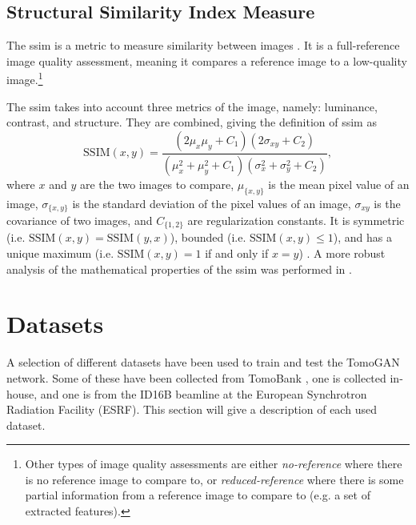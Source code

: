 
\subsection{Structural Similarity Index Measure}
The \gls{ssim} is a metric to measure similarity between images \cite{ssim}. It is a full-reference image quality assessment, meaning it compares a reference image to a low-quality image.\footnote{Other types of image quality assessments are either \textit{no-reference} where there is no reference image to compare to, or \textit{reduced-reference} where there is some partial information from a reference image to compare to (e.g. a set of extracted features)\cite{ssim}. }

The \gls{ssim} takes into account three metrics of the image, namely: luminance, contrast, and structure. They are combined, giving the definition of \gls{ssim} as \cite{ssim}
\begin{equation}
    \label{eq:ssim}
    \text{SSIM}\left(x,y\right) = \frac{\left( 2\mu_x \mu_y + C_1 \right) \left( 2\sigma_{xy} + C_2 \right)}{\left( \mu_x^2 + \mu_y^2 + C_1 \right) \left( \sigma_x^2 + \sigma_y^2 + C_2 \right)},
\end{equation}
where $x$ and $y$ are the two images to compare, $\mu_{\{x,y\}}$ is the mean pixel value of an image, $\sigma_{\{x,y\}}$ is the standard deviation of the pixel values of an image, $\sigma_{xy}$ is the covariance of two images, and $C_{\{1,2\}}$ are regularization constants. It is symmetric (i.e. $\text{SSIM}\left(x,y\right) = \text{SSIM}\left(y,x\right)$), bounded (i.e. $\text{SSIM}\left(x,y\right) \leq 1$), and has a unique maximum (i.e. $\text{SSIM}\left(x,y\right) = 1$ if and only if $x = y$) \cite{ssim}. A more robust analysis of the mathematical properties of the \gls{ssim} was performed in \cite{6059504}.


\section{Datasets}
\label{sec:method:datasets}
A selection of different datasets have been used to train and test the TomoGAN network. Some of these have been collected from TomoBank \cite{TomoBank}, one is collected in-house, and one is from the ID16B beamline at the European Synchrotron Radiation Facility (ESRF). This section will give a description of each used dataset. 

